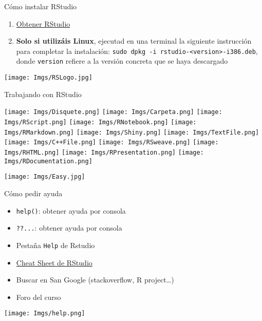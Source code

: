 \documentclass[
  ignorenonframetext,
]{beamer}
\providecommand{\tightlist}{%
  \setlength{\itemsep}{0pt}\setlength{\parskip}{0pt}}
\begin{document}
\begin{frame}[fragile]{Cómo instalar RStudio}
\protect\hypertarget{cuxf3mo-instalar-rstudio}{}

\begin{enumerate}
\tightlist
\item
  \href{http://www.rstudio.com/products/rstudio/download/}{Obtener
  RStudio}
\item
  \textbf{Solo si utilizáis Linux}, ejecutad en una terminal la
  siguiente instrucción para completar la instalación:
  \texttt{sudo\ dpkg\ -i\ rstudio-\textless{}version\textgreater{}-i386.deb},
  donde \texttt{version} refiere a la versión concreta que se haya
  descargado
\end{enumerate}

\texttt{[image: Imgs/RSLogo.jpg]}

\end{frame}

\begin{frame}{Trabajando con RStudio}
\protect\hypertarget{trabajando-con-rstudio}{}

\texttt{[image: Imgs/Disquete.png]} \texttt{[image: Imgs/Carpeta.png]}
\texttt{[image: Imgs/RScript.png]} \texttt{[image: Imgs/RNotebook.png]}
\texttt{[image: Imgs/RMarkdown.png]} \texttt{[image: Imgs/Shiny.png]}
\texttt{[image: Imgs/TextFile.png]} \texttt{[image: Imgs/C++File.png]}
\texttt{[image: Imgs/RSweave.png]} \texttt{[image: Imgs/RHTML.png]}
\texttt{[image: Imgs/RPresentation.png]}
\texttt{[image: Imgs/RDocumentation.png]}

\texttt{[image: Imgs/Easy.jpg]}

\end{frame}

\begin{frame}[fragile]{Cómo pedir ayuda}
\protect\hypertarget{cuxf3mo-pedir-ayuda}{}

\begin{itemize}
\tightlist
\item
  \texttt{help()}: obtener ayuda por consola
\item
  \texttt{??...}: obtener ayuda por consola
\item
  Pestaña \texttt{Help} de Rstudio
\item
  \href{https://www.rstudio.com/wp-content/uploads/2015/02/rmarkdown-cheatsheet.pdf}{Cheat
  Sheet de RStudio}
\item
  Buscar en San Google (stackoverflow, R project\ldots)
\item
  Foro del curso
\end{itemize}

\texttt{[image: Imgs/help.png]}

\end{frame}
\end{document}
